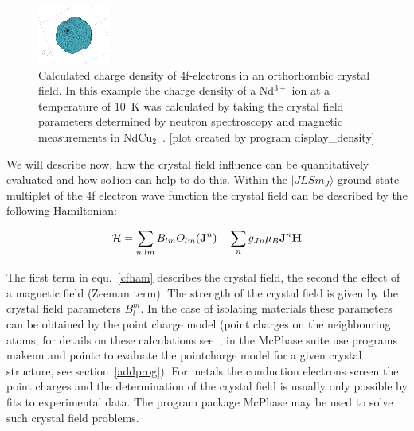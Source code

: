 \begin{figure}[ht]
\includegraphics[angle=0,width=0.7\columnwidth]{figsrc/chrgpla.eps}
\caption{\label{chrgplb}
Calculated charge density of 4f-electrons in an orthorhombic crystal field. In
this example the charge density of a Nd$^{3+}$ ion at a temperature of 10~K was 
calculated by taking the crystal
field parameters determined by neutron spectroscopy and 
magnetic measurements in NdCu$_2$~\cite{gratz91-9297}.
[plot created by program {\prg display\_density}]}
\end{figure}

We will describe now, how the crystal field influence can be quantitatively evaluated
and how {\prg so1ion}  can help to do this.
Within the $|JLSm_J \rangle$ ground state multiplet of the 4f electron wave function 
the crystal field can be described by the following Hamiltonian:

\begin{equation}
\label{cfham}
 {\mathcal H}= \sum_{n,lm} B_{lm} O_{lm}({\mathbf J}^n) 
	     - \sum_{n} g_{Jn} \mu_B {\mathbf J}^n {\mathbf H} 
\end{equation}

The first term in equ.~\ref{cfham} describes the crystal field, the second the
effect of a magnetic field (Zeeman term). The strength of the crystal field is given by the
crystal field parameters $B_l^m$. In the case of isolating materials these
parameters can be obtained by the point charge model (point charges on the 
neighbouring atoms, for details on these calculations see~\cite{hutchings64-227},
in the {\prg McPhase} suite use programs {\prg makenn} and {\prg pointc} to evaluate
the pointcharge model for a given crystal structure, see section~\ref{addprog}).
For metals the conduction electrons screen the point charges and the determination
of the crystal field is usually only possible by fits to experimental data. 
The program package {\prg McPhase} may be used to solve such crystal field problems.


